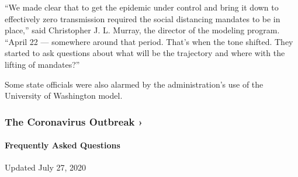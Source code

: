 ``We made clear that to get the epidemic under control and bring it down
to effectively zero transmission required the social distancing mandates
to be in place,'' said Christopher J. L. Murray, the director of the
modeling program. ``April 22 --- somewhere around that period. That's
when the tone shifted. They started to ask questions about what will be
the trajectory and where with the lifting of mandates?''

Some state officials were also alarmed by the administration's use of
the University of Washington model.

\href{https://www.nytimes.com/news-event/coronavirus?action=click\&pgtype=Article\&state=default\&region=MAIN_CONTENT_3\&context=storylines_faq}{}

\hypertarget{the-coronavirus-outbreak-}{%
\subsubsection{The Coronavirus Outbreak
›}\label{the-coronavirus-outbreak-}}

\hypertarget{frequently-asked-questions}{%
\paragraph{Frequently Asked
Questions}\label{frequently-asked-questions}}

Updated July 27, 2020

